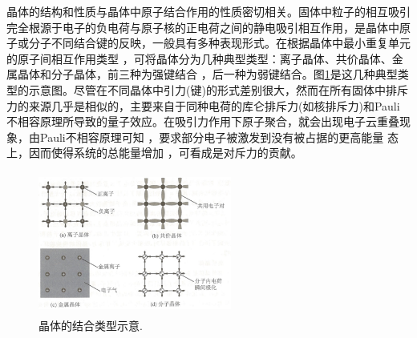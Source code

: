 晶体的结构和性质与晶体中原子结合作用的性质密切相关。固体中粒子的相互吸引完全根源于电子的负电荷与原子核的正电荷之间的静电吸引相互作用，是晶体中原子或分子不同结合键的反映，一般具有多种表现形式。在根据晶体中最小重复单元的原子间相互作用类型 ，可将晶体分为几种典型类型：离子晶体、共价晶体、金属晶体和分子晶体，前三种为强键结合 ，后一种为弱键结合。图\ref{Fig:SSI-05}是这几种典型类型的示意图。尽管在不同晶体中引力(键)的形式差别很大，然而在所有固体中排斥力的来源几乎是相似的，主要来自于同种电荷的库仑排斥力(如核排斥力)和Pauli不相容原理所导致的量子效应。在吸引力作用下原子聚合，就会出现电子云重叠现象，由Pauli不相容原理可知 ，要求部分电子被激发到没有被占据的更高能量 态上，因而使得系统的总能量增加 ，可看成是对斥力的贡献。
\begin{figure}[h!]
\centering
\vspace*{-0.1in}
\includegraphics[height=1.85in,width=2.5in,viewport=0 0 90 70,clip]{Figures/Four_Crystal-type.png}
\caption{\small \textrm{晶体的结合类型示意.}}%
\label{Fig:SSI-05}
\end{figure}

